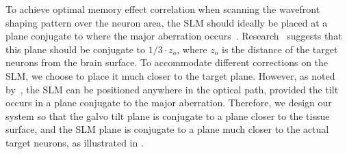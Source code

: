 



To achieve optimal memory effect correlation when scanning the wavefront shaping pattern over the neuron area, the SLM should ideally be placed at a plane conjugate to where the major aberration occurs~\cite{Mertz:15,Park2015,Tao2017}. Research~\cite{osnabrugge2017generalized,SeeThroughSubmission} suggests that this plane should be conjugate to $1/3\cdot z_o$,  where $z_o$
is the distance of the target neurons from the brain surface.
To accommodate different corrections on the SLM, we choose to place it much closer to the target plane. However, as noted by~\cite{Papadopoulos2020}, the SLM can be positioned anywhere in the optical path, provided the tilt occurs in a plane conjugate to the major aberration. Therefore, we design our system so that the galvo tilt plane is conjugate to a plane closer to the tissue surface, and the SLM plane is conjugate to a plane much closer to the actual target neurons, as illustrated in .

